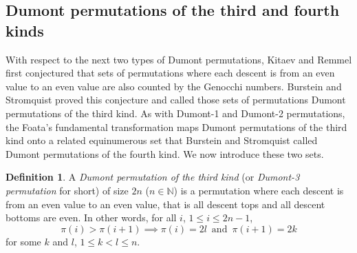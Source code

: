 \documentclass[
final
]{dmtcs-episciences}
\theoremstyle{definition}
\newtheorem{definition}[theorem]{Definition}
\newtheorem{example}[theorem]{Example}
\theoremstyle{remark}
\begin{document}
%



\subsection{Dumont permutations of the third and fourth kinds}

With respect to the next two types of Dumont permutations, Kitaev and Remmel \cite {Kitaev_Remmel_1, Kitaev_Remmel_2} first conjectured that sets of permutations where each descent is from an even value to an even value are also counted by the Genocchi numbers.  Burstein and Stromquist \cite {Burstein_Third} proved this conjecture and called those sets of permutations Dumont permutations of the third kind. As with Dumont-1 and Dumont-2 permutations, the Foata's fundamental transformation maps Dumont permutations of the third kind onto a related equinumerous set that Burstein and Stromquist  \cite {Burstein_Third} called Dumont permutations of the fourth kind.  We now introduce these two sets.

\begin{definition}
A \emph{Dumont permutation of the third kind} (or \emph{Dumont-3 permutation} for short) of size $2n$ ($n\in\mathbb{N}$) is a permutation where each descent is from an even value to an even value, that is all descent tops and all descent bottoms are even.  In other words, for all $i$, $1 \leq i \leq 2n-1$,
$$\pi(i) > \pi(i+1) \implies \pi (i) = 2l \, \text{ and }\, \pi(i+1) = 2k$$
for some $k$ and $l$, $1 \leq k < l \leq n$.
\end{definition}
\end{document}
